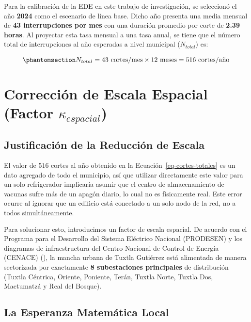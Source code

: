 \documentclass[
  spanish,
  us-letterpaper,
]{scrreprt}
\numberwithin{equation}{section}
\theoremstyle{plain}
\theoremstyle{plain}
\theoremstyle{plain}
\theoremstyle{definition}
\theoremstyle{remark}
\begin{document}
Para la calibración de la EDE en este trabajo de investigación, se
seleccionó el año \textbf{2024} como el escenario de línea base. Dicho
año presenta una media mensual de \textbf{43 interrupciones por mes} con
una duración promedio por corte de \textbf{2.39 horas}. Al proyectar
esta tasa mensual a una tasa anual, se tiene que el número total de
interrupciones al año esperadas a nivel municipal (\(N_{total}\)) es:

\begin{equation}\phantomsection\label{eq-cortes-totales}{
N_{total} = 43 \text{ cortes/mes} \times 12 \text{ meses} = 516 \text{ cortes/año}
}\end{equation}

\section{\texorpdfstring{Corrección de Escala Espacial (Factor
\(\kappa_{espacial}\))}{Corrección de Escala Espacial (Factor \textbackslash kappa\_\{espacial\})}}\label{sec-escala-espacial}

\subsection{Justificación de la Reducción de
Escala}\label{justificaciuxf3n-de-la-reducciuxf3n-de-escala}

El valor de \(516\) cortes al año obtenido en la
Ecuación~\ref{eq-cortes-totales} es un dato agregado de todo el
municipio, así que utilizar directamente este valor para un solo
refrigerador implicaría asumir que el centro de almacenamiento de
vacunas sufre más de un apagón diario, lo cual no es físicamente real.
Este error ocurre al ignorar que un edificio está conectado a un solo
nodo de la red, no a todos simultáneamente.

Para solucionar esto, introducimos un factor de escala espacial. De
acuerdo con el Programa para el Desarrollo del Sistema Eléctrico
Nacional (PRODESEN) y los diagramas de infraestructura del Centro
Nacional de Control de Energía (CENACE)
(), la
mancha urbana de Tuxtla Gutiérrez está alimentada de manera sectorizada
por exactamente \textbf{8 subestaciones principales} de distribución
(Tuxtla Céntrica, Oriente, Poniente, Terán, Tuxtla Norte, Tuxtla Dos,
Mactumatzá y Real del Bosque).

\subsection{La Esperanza Matemática
Local}\label{la-esperanza-matemuxe1tica-local}
\end{document}
